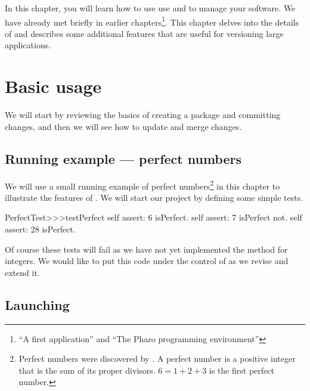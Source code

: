 \documentclass[a4paper,10pt,twoside]{book}
\begin{document}
In this chapter, you will learn how to use use \MC and \sqsrc to manage your software. We have already met \MC briefly in earlier chapters\footnote{``A first application'' and ``The Pharo programming environment''}.
This chapter delves into the details of \MC{} and describes some additional features that are useful for versioning large applications.

\section{Basic usage}

We will start by reviewing the basics of creating a package and committing changes, and then we will see how to update and merge changes. 

\subsection{Running example --- perfect numbers}

We will use a small running example of perfect numbers\footnote{Perfect numbers were discovered by . A perfect number is a positive integer that is the sum of its proper divisors. $6 = 1 + 2 + 3$ is the first perfect number.} in this chapter to illustrate the features of \MC. We will start our project by defining some simple tests.

\begin{code}{}
PerfectTest>>>testPerfect
	self assert: 6 isPerfect.
	self assert: 7 isPerfect not.
	self assert: 28 isPerfect.
\end{code}

Of course these tests will fail as we have not yet implemented the  method for integers. We would like to put this code under the control of \MC as we revise and extend it.

\subsection{Launching \MC}
\end{document}
